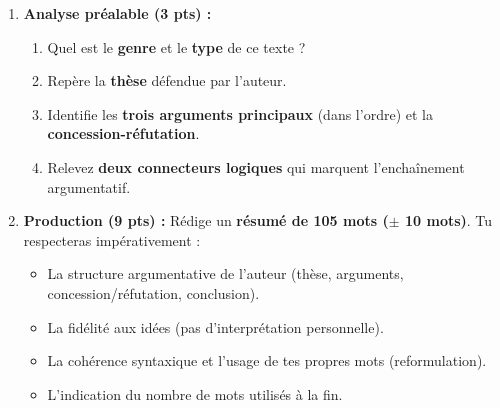 \documentclass[11pt]{article}
\begin{document}
\begin{exercice}
\begin{enumerate}
    \item \textbf{Analyse préalable (3 pts) :}
    \begin{enumerate}
        \item Quel est le \textbf{genre} et le \textbf{type} de ce texte ?
        \item Repère la \textbf{thèse} défendue par l'auteur.
        \item Identifie les \textbf{trois arguments principaux} (dans l'ordre) et la \textbf{concession-réfutation}.
        \item Relevez \textbf{deux connecteurs logiques} qui marquent l'enchaînement argumentatif.
    \end{enumerate}
    \item \textbf{Production (9 pts) :}
    Rédige un \textbf{résumé de 105 mots ($\pm$ 10 mots)}. Tu respecteras impérativement :
    \begin{itemize}
        \item La structure argumentative de l'auteur (thèse, arguments, concession/réfutation, conclusion).
        \item La fidélité aux idées (pas d'interprétation personnelle).
        \item La cohérence syntaxique et l'usage de tes propres mots (reformulation).
        \item L'indication du nombre de mots utilisés à la fin.
    \end{itemize}
\end{enumerate}
\end{exercice}
\end{document}
